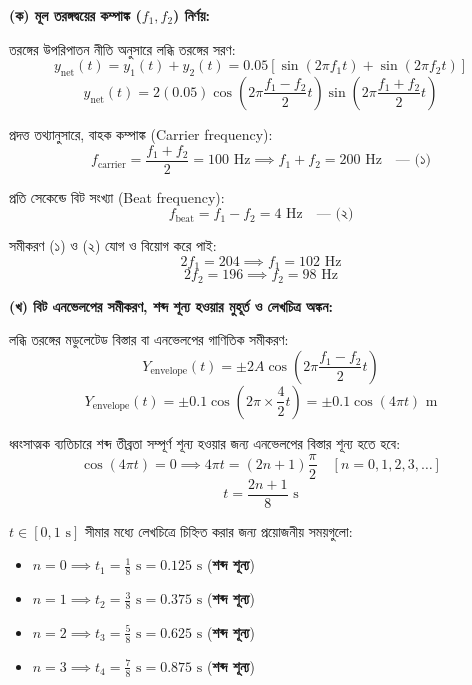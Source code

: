 \documentclass[12pt, a4paper]{article}
\begin{document}
\begin{tcolorbox}[solutionbox={সমাধান (Solution)}]
\noindent
\textbf{(ক) মূল তরঙ্গদ্বয়ের কম্পাঙ্ক ($f_1, f_2$) নির্ণয়:}

\vspace{0.5em}
\noindent
তরঙ্গের উপরিপাতন নীতি অনুসারে লব্ধি তরঙ্গের সরণ:
\[ y_{\text{net}}(t) = y_1(t) + y_2(t) = 0.05 \left[\sin(2\pi f_1 t) + \sin(2\pi f_2 t)\right] \]
\[ y_{\text{net}}(t) = 2 (0.05) \cos\left(2\pi \frac{f_1 - f_2}{2} t\right) \sin\left(2\pi \frac{f_1 + f_2}{2} t\right) \]

\noindent
প্রদত্ত তথ্যানুসারে, বাহক কম্পাঙ্ক (Carrier frequency):
\[ f_{\text{carrier}} = \frac{f_1 + f_2}{2} = 100\text{ Hz} \implies f_1 + f_2 = 200\text{ Hz} \quad \text{--- (১)} \]

\noindent
প্রতি সেকেন্ডে বিট সংখ্যা (Beat frequency):
\[ f_{\text{beat}} = f_1 - f_2 = 4\text{ Hz} \quad \text{--- (২)} \]

\noindent
সমীকরণ (১) ও (২) যোগ ও বিয়োগ করে পাই:
\[ 2f_1 = 204 \implies f_1 = 102\text{ Hz} \]
\[ 2f_2 = 196 \implies f_2 = 98\text{ Hz} \]

\vspace{1em}
\noindent
\textbf{(খ) বিট এনভেলপের সমীকরণ, শব্দ শূন্য হওয়ার মুহূর্ত ও লেখচিত্র অঙ্কন:}

\vspace{0.5em}
\noindent
লব্ধি তরঙ্গের মডুলেটেড বিস্তার বা এনভেলপের গাণিতিক সমীকরণ:
\[ Y_{\text{envelope}}(t) = \pm 2A \cos\left(2\pi \frac{f_1 - f_2}{2} t\right) \]
\[ Y_{\text{envelope}}(t) = \pm 0.1 \cos\left(2\pi \times \frac{4}{2} t\right) = \pm 0.1 \cos(4\pi t)\text{ m} \]

\vspace{0.3em}
\noindent
ধ্বংসাত্মক ব্যতিচারে শব্দ তীব্রতা সম্পূর্ণ শূন্য হওয়ার জন্য এনভেলপের বিস্তার শূন্য হতে হবে:
\[ \cos(4\pi t) = 0 \implies 4\pi t = (2n + 1)\frac{\pi}{2} \quad [n = 0, 1, 2, 3, \dots] \]
\[ t = \frac{2n + 1}{8}\text{ s} \]

\vspace{0.3em}
\noindent
$t \in [0, 1\text{ s}]$ সীমার মধ্যে লেখচিত্রে চিহ্নিত করার জন্য প্রয়োজনীয় সময়গুলো:
\begin{itemize}[leftmargin=2em, itemsep=0.2em]
    \item $n = 0 \implies t_1 = \frac{1}{8}\text{ s} = 0.125\text{ s}$ \quad (\textbf{শব্দ শূন্য})
    \item $n = 1 \implies t_2 = \frac{3}{8}\text{ s} = 0.375\text{ s}$ \quad (\textbf{শব্দ শূন্য})
    \item $n = 2 \implies t_3 = \frac{5}{8}\text{ s} = 0.625\text{ s}$ \quad (\textbf{শব্দ শূন্য})
    \item $n = 3 \implies t_4 = \frac{7}{8}\text{ s} = 0.875\text{ s}$ \quad (\textbf{শব্দ শূন্য})
\end{itemize}


\end{tcolorbox}
\end{document}
